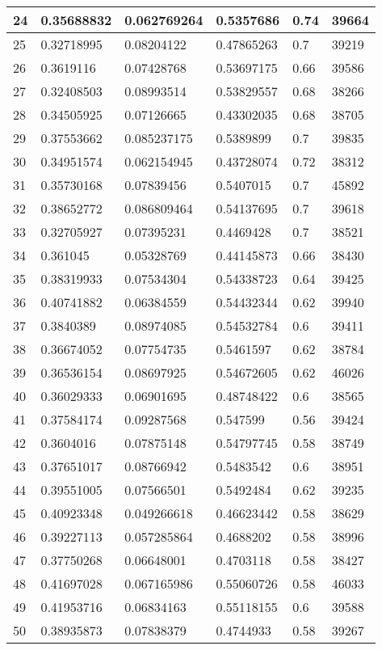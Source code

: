 \begin{longtable}{|l|l|l|l|l|l|}
24 & 0.35688832 & 0.062769264 & 0.5357686 & 0.74 & 39664 \\ \hline 
25 & 0.32718995 & 0.08204122 & 0.47865263 & 0.7 & 39219 \\ \hline 
26 & 0.3619116 & 0.07428768 & 0.53697175 & 0.66 & 39586 \\ \hline 
27 & 0.32408503 & 0.08993514 & 0.53829557 & 0.68 & 38266 \\ \hline 
28 & 0.34505925 & 0.07126665 & 0.43302035 & 0.68 & 38705 \\ \hline 
29 & 0.37553662 & 0.085237175 & 0.5389899 & 0.7 & 39835 \\ \hline 
30 & 0.34951574 & 0.062154945 & 0.43728074 & 0.72 & 38312 \\ \hline 
31 & 0.35730168 & 0.07839456 & 0.5407015 & 0.7 & 45892 \\ \hline 
32 & 0.38652772 & 0.086809464 & 0.54137695 & 0.7 & 39618 \\ \hline 
33 & 0.32705927 & 0.07395231 & 0.4469428 & 0.7 & 38521 \\ \hline 
34 & 0.361045 & 0.05328769 & 0.44145873 & 0.66 & 38430 \\ \hline 
35 & 0.38319933 & 0.07534304 & 0.54338723 & 0.64 & 39425 \\ \hline 
36 & 0.40741882 & 0.06384559 & 0.54432344 & 0.62 & 39940 \\ \hline 
37 & 0.3840389 & 0.08974085 & 0.54532784 & 0.6 & 39411 \\ \hline 
38 & 0.36674052 & 0.07754735 & 0.5461597 & 0.62 & 38784 \\ \hline 
39 & 0.36536154 & 0.08697925 & 0.54672605 & 0.62 & 46026 \\ \hline 
40 & 0.36029333 & 0.06901695 & 0.48748422 & 0.6 & 38565 \\ \hline 
41 & 0.37584174 & 0.09287568 & 0.547599 & 0.56 & 39424 \\ \hline 
42 & 0.3604016 & 0.07875148 & 0.54797745 & 0.58 & 38749 \\ \hline 
43 & 0.37651017 & 0.08766942 & 0.5483542 & 0.6 & 38951 \\ \hline 
44 & 0.39551005 & 0.07566501 & 0.5492484 & 0.62 & 39235 \\ \hline 
45 & 0.40923348 & 0.049266618 & 0.46623442 & 0.58 & 38629 \\ \hline 
46 & 0.39227113 & 0.057285864 & 0.4688202 & 0.58 & 38996 \\ \hline 
47 & 0.37750268 & 0.06648001 & 0.4703118 & 0.58 & 38427 \\ \hline 
48 & 0.41697028 & 0.067165986 & 0.55060726 & 0.58 & 46033 \\ \hline 
49 & 0.41953716 & 0.06834163 & 0.55118155 & 0.6 & 39588 \\ \hline 
50 & 0.38935873 & 0.07838379 & 0.4744933 & 0.58 & 39267 \\ \hline 
\end{longtable}